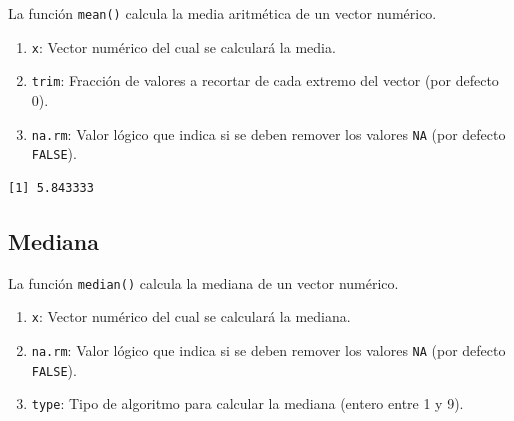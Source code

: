 \documentclass[
  spanish,
  letterpaper,
]{book}
\newenvironment{Shaded}{\begin{snugshade}}{\end{snugshade}}
\newcommand{\CommentTok}[1]{\textcolor[rgb]{0.37,0.37,0.37}{#1}}
\newcommand{\FunctionTok}[1]{\textcolor[rgb]{0.28,0.35,0.67}{#1}}
\newcommand{\NormalTok}[1]{\textcolor[rgb]{0.00,0.23,0.31}{#1}}
\newcommand{\SpecialCharTok}[1]{\textcolor[rgb]{0.37,0.37,0.37}{#1}}
\begin{document}
La función \texttt{mean()} calcula la media aritmética de un vector
numérico.

\begin{enumerate}
\def\labelenumi{\arabic{enumi}.}
\item
  \texttt{x}: Vector numérico del cual se calculará la media.
\item
  \texttt{trim}: Fracción de valores a recortar de cada extremo del
  vector (por defecto 0).
\item
  \texttt{na.rm}: Valor lógico que indica si se deben remover los
  valores \texttt{NA} (por defecto \texttt{FALSE}).
\end{enumerate}

\begin{Shaded}
\end{Shaded}

\begin{verbatim}
[1] 5.843333
\end{verbatim}

\subsection{Mediana}\label{mediana-1}

La función \texttt{median()} calcula la mediana de un vector numérico.

\begin{enumerate}
\def\labelenumi{\arabic{enumi}.}
\item
  \texttt{x}: Vector numérico del cual se calculará la mediana.
\item
  \texttt{na.rm}: Valor lógico que indica si se deben remover los
  valores \texttt{NA} (por defecto \texttt{FALSE}).
\item
  \texttt{type}: Tipo de algoritmo para calcular la mediana (entero
  entre 1 y 9).
\end{enumerate}

\begin{Shaded}
\end{Shaded}
\end{document}
